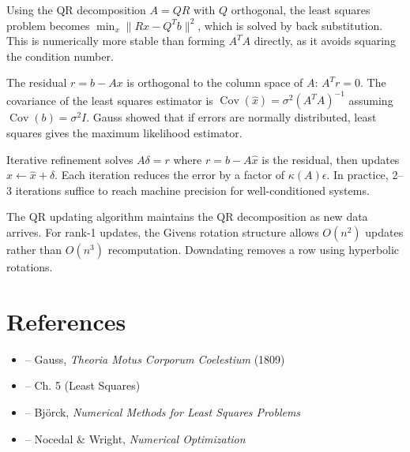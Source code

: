 \begin{solution}
Using the QR decomposition $A = QR$ with $Q$ orthogonal, the least squares problem becomes $\min_x \|Rx - Q^Tb\|^2$, which is solved by back substitution. This is numerically more stable than forming $A^TA$ directly, as it avoids squaring the condition number.
\end{solution}

\begin{solution}
The residual $r = b - Ax$ is orthogonal to the column space of $A$: $A^Tr = 0$. The covariance of the least squares estimator is $\operatorname{Cov}(\hat{x}) = \sigma^2(A^TA)^{-1}$ assuming $\operatorname{Cov}(b) = \sigma^2 I$. Gauss showed that if errors are normally distributed, least squares gives the maximum likelihood estimator.
\end{solution}

\begin{solution}
Iterative refinement solves $A\delta = r$ where $r = b - A\hat{x}$ is the residual, then updates $\hat{x} \leftarrow \hat{x} + \delta$. Each iteration reduces the error by a factor of $\kappa(A)\epsilon$. In practice, 2--3 iterations suffice to reach machine precision for well-conditioned systems.
\end{solution}

\begin{solution}
The QR updating algorithm maintains the QR decomposition as new data arrives. For rank-1 updates, the Givens rotation structure allows $O(n^2)$ updates rather than $O(n^3)$ recomputation. Downdating removes a row using hyperbolic rotations.
\end{solution}


\section{References}

\begin{itemize}
    \item \cite{gauss-theoria} -- Gauss, \textit{Theoria Motus Corporum Coelestium} (1809)
    \item \cite{golub-vanloan} -- Ch. 5 (Least Squares)
    \item \cite{bjorck} -- Björck, \textit{Numerical Methods for Least Squares Problems}
    \item \cite{nocedal-wright} -- Nocedal \& Wright, \textit{Numerical Optimization}
\end{itemize}